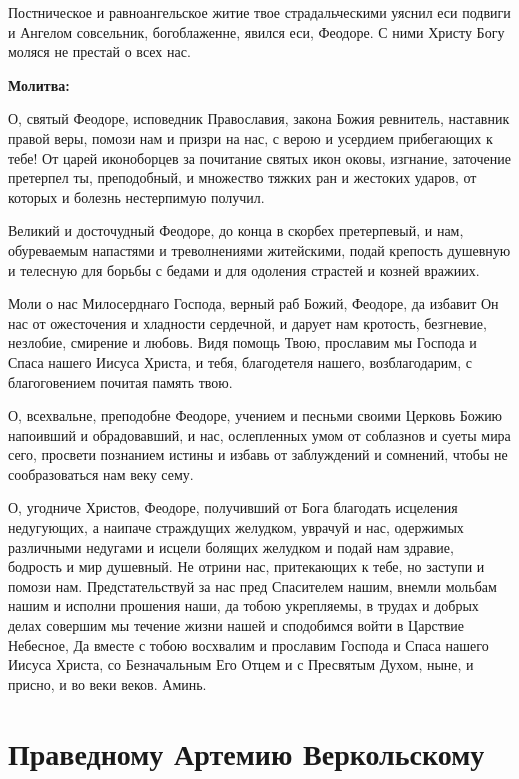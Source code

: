 Постническое и равноангельское житие твое страдальческими уяснил еси подвиги и Ангелом совсельник, богоблаженне, явился еси, Феодоре. С ними Христу Богу моляся не престай о всех нас. 


\medskip


\bfseries Молитва:\normalfont{}\nopagebreak


О, святый Феодоре, исповедник Православия, закона Божия ревнитель, наставник правой веры, помози нам и призри на нас, с верою и усердием прибегающих к тебе! От царей иконоборцев за почитание святых икон оковы, изгнание, заточение претерпел ты, преподобный, и множество тяжких ран и жестоких ударов, от которых и болезнь нестерпимую получил. 

Великий и досточудный Феодоре, до конца в скорбех претерпевый, и нам, обуреваемым напастями и треволнениями житейскими, подай крепость душевную и телесную для борьбы с бедами и для одоления страстей и козней вражиих. 

Моли о нас Милосерднаго Господа, верный раб Божий, Феодоре, да избавит Он нас от ожесточения и хладности сердечной, и дарует нам кротость, безгневие, незлобие, смирение и любовь. Видя помощь Твою, прославим мы Господа и Спаса нашего Иисуса Христа, и тебя, благодетеля нашего, возблагодарим, с благоговением почитая память твою. 

О, всехвальне, преподобне Феодоре, учением и песньми своими Церковь Божию напоивший и обрадовавший, и нас, ослепленных умом от соблазнов и суеты мира сего, просвети познанием истины и избавь от заблуждений и сомнений, чтобы не сообразоваться нам веку сему. 

О, угодниче Христов, Феодоре, получивший от Бога благодать исцеления недугующих, а наипаче страждущих желудком, уврачуй и нас, одержимых различными недугами и исцели болящих желудком и подай нам здравие, бодрость и мир душевный. Не отрини нас, притекающих к тебе, но заступи и помози нам. Предстательствуй за нас пред Спасителем нашим, внемли мольбам нашим и исполни прошения наши, да тобою укрепляемы, в трудах и добрых делах совершим мы течение жизни нашей и сподобимся войти в Царствие Небесное, Да вместе с тобою восхвалим и прославим Господа и Спаса нашего Иисуса Христа, со Безначальным Его Отцем и с Пресвятым Духом, ныне, и присно, и во веки веков. Аминь.


\section{Праведному Артемию Веркольскому}
 


